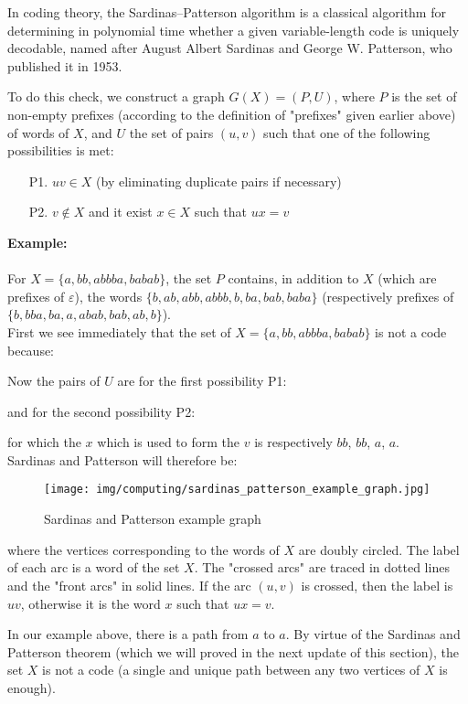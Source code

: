 	In coding theory, the Sardinas–Patterson algorithm is a classical algorithm for determining in polynomial time whether a given variable-length code is uniquely decodable, named after August Albert Sardinas and George W. Patterson, who published it in 1953.

	To do this check, we construct a graph $G(X)=(P,U)$, where $P$ is the set of non-empty prefixes (according to the definition of "prefixes" given earlier above) of words of $X$, and $U$ the set of pairs $(u, v)$ such that one of the following possibilities is met:
	\begin{enumerate}
		\item[P1.] $uv\in X$ (by eliminating duplicate pairs if necessary)

		\item[P2.] $v\notin X$ and it exist $x\in X$ such that $ux=v$
	\end{enumerate}
	\begin{tcolorbox}[colframe=black,colback=white,sharp corners]
	\textbf{{\Large {}}Example:}\\\\	
	For $X=\{a,bb,abbba,babab\}$, the set $P$ contains, in addition to $X$ (which are prefixes of $\varepsilon$), the words $\{b,ab,abb,abbb,b,ba,bab,baba\}$ (respectively prefixes of $\{b,bba,ba,a,abab,bab,ab,b\}$).\\

	First we see immediately that the set of $X=\{a,bb,abbba,babab\}$ is not a code because:
	
	Now the pairs of $U$ are for the first possibility P1:
	
	and for the second possibility P2:
	\end{tcolorbox}
	
	\begin{tcolorbox}[colframe=black,colback=white,sharp corners]
	
	for which the $x$ which is used to form the $v$ is respectively $bb$, $bb$, $a$, $a$.\\
	
	Sardinas and Patterson will therefore be:
	\begin{figure}[H]
		\centering
		\texttt{[image: img/computing/sardinas\_patterson\_example\_graph.jpg]}
		\caption{Sardinas and Patterson example graph}
	\end{figure}
	where the vertices corresponding to the words of $X$ are doubly circled. The label of each arc is a word of the set $X$. The "crossed arcs" are traced in dotted lines and the "front arcs" in solid lines. If the arc $(u,v)$ is crossed, then the label is $uv$, otherwise it is the word $x$ such that $ux = v$.
	\end{tcolorbox}
	In our example above, there is a path from $a$ to $a$. By virtue of the Sardinas and Patterson theorem (which we will proved in the next update of this section), the set $X$ is not a code (a single and unique path between any two vertices of $X$ is enough).
	
